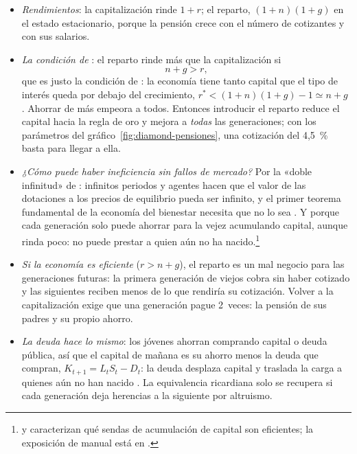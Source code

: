 \documentclass[11pt]{article}
\begin{document}
\begin{itemize}
\item \emph{Rendimientos}: la capitalización rinde $1+r$; el reparto, $(1+n)(1+g)$ en el estado estacionario, porque la pensión crece con el número de cotizantes y con sus salarios.
\item \emph{La condición de }\nocite{Aaron1966Social}: el reparto rinde más que la capitalización si
  \begin{equation}\label{eq:aaron}
  n+g>r,
  \end{equation}
  que es justo la condición de : la economía tiene tanto capital que el tipo de interés queda por debajo del crecimiento, $r^*<(1+n)(1+g)-1\simeq n+g$ . Ahorrar de más empeora a todos. Entonces introducir el reparto reduce el capital hacia la regla de oro y mejora a \emph{todas} las generaciones; con los parámetros del gráfico~\ref{fig:diamond-pensiones}, una cotización del 4,5~\% basta para llegar a ella.
\item \emph{¿Cómo puede haber ineficiencia sin fallos de mercado?} Por la «doble infinitud» de \textcite{Shell1971Notes}: infinitos periodos y agentes hacen que el valor de las dotaciones a los precios de equilibrio pueda ser infinito, y el primer teorema fundamental de la economía del bienestar necesita que no lo sea . Y porque cada generación solo puede ahorrar para la vejez acumulando capital, aunque rinda poco: no puede prestar a quien aún no ha nacido.\footnote{\textcite{Malinvaud1953Capital} y \textcite{Cass1972Capital} caracterizan qué sendas de acumulación de capital son eficientes; la exposición de manual está en \textcite[cap.~9]{Acemoglu2009}.}
\item \emph{Si la economía es eficiente} ($r>n+g$), el reparto es un mal negocio para las generaciones futuras: la primera generación de viejos cobra sin haber cotizado y las siguientes reciben menos de lo que rendiría su cotización. Volver a la capitalización exige que una generación pague 2~veces: la pensión de sus padres y su propio ahorro.
\item \emph{La deuda hace lo mismo}: los jóvenes ahorran comprando capital o deuda pública, así que el capital de mañana es su ahorro menos la deuda que compran, $K_{t+1}=L_tS_t-D_t$: la deuda desplaza capital y traslada la carga a quienes aún no han nacido\nocite{Diamond1965National} . La equivalencia ricardiana solo se recupera si cada generación deja herencias a la siguiente por altruismo\nocite{Barro1974}.
\end{itemize}
\end{document}
